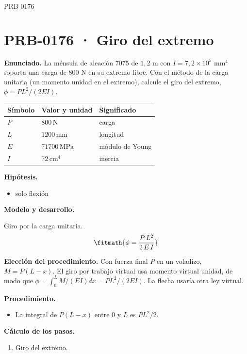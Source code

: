 \begin{studiumworked}{PRB-0176}

\section{PRB-0176 · Giro del extremo}

\textbf{Enunciado.} La ménsula de aleación 7075 de $1{,}2$ m con $I = 7{,}2\times 10^{5}$ mm$^4$ soporta una carga de 800 N en su extremo libre. Con el método de la carga unitaria (un momento unidad en el extremo), calcule el giro del extremo, $\phi = P L^2/(2EI)$.

\par\medskip\noindent\begin{tabular}{@{}p{.18\linewidth}p{.26\linewidth}p{.48\linewidth}@{}}
\toprule Símbolo & Valor y unidad & Significado\\\midrule
$P$ & $800\,\mathrm{N}$ & carga\\
$L$ & $1200\,\mathrm{mm}$ & longitud\\
$E$ & $71700\,\mathrm{MPa}$ & módulo de Young\\
$I$ & $72\,\mathrm{cm^4}$ & inercia\\
\bottomrule\end{tabular}\par\medskip

\textbf{Hipótesis.}\begin{itemize}\item solo flexión\end{itemize}

\textbf{Modelo y desarrollo.}

Giro por la carga unitaria.\[\fitmath{\phi = \frac{P\,L^{2}}{2\,E\,I}}\]

\textbf{Elección del procedimiento.} Con fuerza final $P$ en un voladizo, $M=P(L-x)$. El giro por trabajo virtual usa momento virtual unidad, de modo que $\phi=\int_0^L M/(EI)dx=PL^2/(2EI)$. La flecha usaría otra ley virtual.

\textbf{Procedimiento.}\begin{itemize}\item La integral de $P(L - x)$ entre 0 y $L$ es $P L^2/2$.\end{itemize}

\textbf{Cálculo de los pasos.}

\begin{enumerate}

\item Giro del extremo.


\end{enumerate}
\end{studiumworked}
